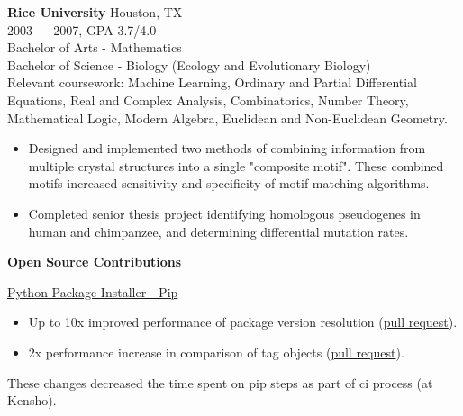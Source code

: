 \myfontsize{\bigheader}
\textbf{Rice University}
\myfontsize{\bodysize}
Houston, TX\\
2003 --- 2007, GPA 3.7/4.0\\
Bachelor of Arts - Mathematics\\
Bachelor of Science - Biology (Ecology and Evolutionary Biology)\\
Relevant coursework: Machine Learning, Ordinary and Partial Differential Equations, Real and Complex Analysis, Combinatorics, Number Theory, Mathematical Logic, Modern Algebra, Euclidean and Non-Euclidean Geometry.
\begin{itemize}[topsep=1ex, partopsep=0ex, parsep=0ex, itemsep=0.5ex]
    \item Designed and implemented two methods of combining information from multiple crystal structures into a single "composite motif". These combined motifs increased sensitivity and specificity of motif matching algorithms.
    \item Completed senior thesis project identifying homologous pseudogenes in human and chimpanzee, and determining differential mutation rates.
\end{itemize}

\hrulefill
\vspace{\littleskip}

\myfontsize{\bigheader}
\textbf{Open Source Contributions}
\myfontsize{\bodysize}\\


\vspace{\littleskip}
\vspace{\littleskip}

\myfontsize{\littleheader}
\href{https://github.com/pypa/pip}{Python Package Installer - Pip}\\
\myfontsize{\bodysize}

\begin{itemize}[topsep=1ex, partopsep=0ex, parsep=0ex, itemsep=0.5ex]
    \item Up to 10x improved performance of package version resolution (\href{https://github.com/pypa/pip/pull/9748}{pull request}).
    \item 2x performance increase in comparison of tag objects (\href{https://github.com/pypa/packaging/pull/417}{pull request}).
\end{itemize}
These changes decreased the time spent on pip steps as part of ci process (at Kensho).

